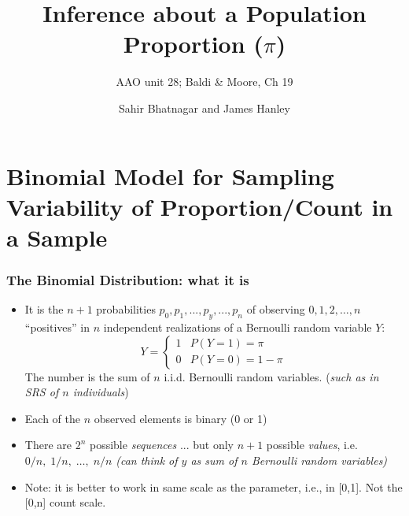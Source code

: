 \documentclass{beamer}\usepackage[]{graphicx}\usepackage[]{color}
\begin{document}




\title{Inference about a Population Proportion ($\pi$)}
\subtitle{AAO unit 28; Baldi \& Moore, Ch 19}
\author{Sahir Bhatnagar and James Hanley}


\maketitle

\section{Binomial Model for Sampling Variability of Proportion/Count in a Sample}




\begin{frame}
\frametitle{The Binomial Distribution: what it is}
\small
\begin{itemize}
	\setlength\itemsep{0.5em}
	\item It is the $n+1$ probabilities $p_{0}, p_{1}, ..., p_{y}, ..., p_{n}$ of observing 
	$0, 1, 2, \dots , n$ ``positives''  in $n$ independent realizations of a Bernoulli random variable $Y$:
	$$
	Y = \begin{cases}
	1 & P(Y=1) = \pi \\
	0 & P(Y=0) = 1-\pi
	\end{cases}	
	$$
	The number is the sum of $n$ i.i.d. Bernoulli random variables.
	(\emph{such as in SRS of $n$ individuals}) \pause 
	\item Each of the $n$ observed elements is binary (0 or 1) \pause 
	\item There are $2^{n}$ possible \textit{sequences} ... but only $n+1$ possible \textit{values}, 
	i.e. $0/n,\;1/n,\;\dots ,\;n/n$  \emph{(can think of $y$ as sum of $n$ Bernoulli random variables)} 
	\item Note: it is better to work in same scale as the parameter, i.e., in [0,1]. Not the [0,n] count scale.
\end{itemize}
\end{frame}	
	
\end{document}
